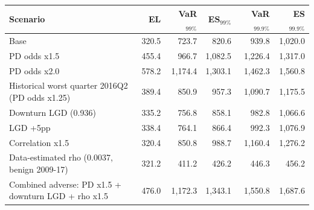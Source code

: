 \begin{tabular}{p{7.2cm}rrrrr}
\toprule
Scenario & EL & VaR$_{99\%}$ & ES$_{99\%}$ & VaR$_{99.9\%}$ & ES$_{99.9\%}$ \\
\midrule
Base & 320.5 & 723.7 & 820.6 & 939.8 & 1,020.0 \\
PD odds x1.5 & 455.4 & 966.7 & 1,082.5 & 1,226.4 & 1,317.0 \\
PD odds x2.0 & 578.2 & 1,174.4 & 1,303.1 & 1,462.3 & 1,560.8 \\
Historical worst quarter 2016Q2 (PD odds x1.25) & 389.4 & 850.9 & 957.3 & 1,090.7 & 1,175.5 \\
Downturn LGD (0.936) & 335.2 & 756.8 & 858.1 & 982.8 & 1,066.6 \\
LGD +5pp & 338.4 & 764.1 & 866.4 & 992.3 & 1,076.9 \\
Correlation x1.5 & 320.4 & 850.8 & 988.7 & 1,160.4 & 1,276.2 \\
Data-estimated rho (0.0037, benign 2009-17) & 321.2 & 411.2 & 426.2 & 446.3 & 456.2 \\
Combined adverse: PD x1.5 + downturn LGD + rho x1.5 & 476.0 & 1,172.3 & 1,343.1 & 1,550.8 & 1,687.6 \\
\bottomrule
\end{tabular}
